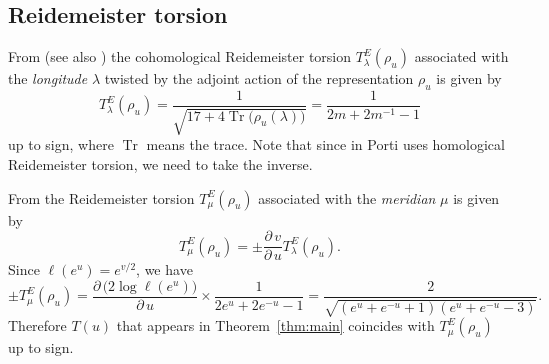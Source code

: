 \documentclass[a4paper]{amsart}
\theoremstyle{plain}
\theoremstyle{definition}
\theoremstyle{remark}
\newcommand{\Tr}{\operatorname{Tr}}
\numberwithin{equation}{section}
\begin{document}
\subsection{Reidemeister torsion}
From \cite[P.~113]{Porti:MAMCAU1997} (see also \cite[\S~6.3]{Dubois:CANMB2006}) the cohomological Reidemeister torsion $T^{E}_{\lambda}(\rho_u)$ associated with the {\em longitude} $\lambda$ twisted by the adjoint action of the representation $\rho_u$ is given by
\begin{equation*}
  T^{E}_{\lambda}(\rho_u)
  =
  \frac{1}{\sqrt{17+4\Tr\bigl(\rho_u(\lambda)\bigr)}}
  =
  \frac{1}{2m+2m^{-1}-1}
\end{equation*}
up to sign, where $\Tr$ means the trace.
Note that since in \cite{Porti:MAMCAU1997} Porti uses homological Reidemeister torsion, we need to take the inverse.
\par
From \cite[Th{\'e}or{\`e}me~4.1]{Porti:MAMCAU1997} the Reidemeister torsion $T^{E}_{\mu}(\rho_u)$ associated with the {\em meridian} $\mu$ is given by 
\begin{equation*}
  T^{E}_{\mu}(\rho_u)
  =
  \pm\frac{\partial\, v}{\partial\, u}T^{E}_{\lambda}(\rho_u).
\end{equation*}
Since $\ell(e^u)=e^{v/2}$, we have
\begin{equation*}
  \pm
  T^{E}_{\mu}(\rho_u)
  =
  \frac{\partial\,\bigl(2\log\ell(e^{u})\bigr)}{\partial\, u}
  \times
  \frac{1}{2e^u+2e^{-u}-1}
  =
  \frac{2}{\sqrt{(e^u+e^{-u}+1)(e^{u}+e^{-u}-3)}}.
\end{equation*}
Therefore $T(u)$ that appears in Theorem~\ref{thm:main} coincides with $T^{E}_{\mu}(\rho_u)$ up to sign.
\end{document}
